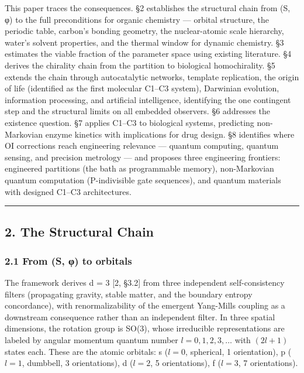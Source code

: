 \documentclass[
]{article}
\begin{document}
This paper traces the consequences. §2 establishes the structural chain
from (S, φ) to the full preconditions for organic chemistry --- orbital
structure, the periodic table, carbon's bonding geometry, the
nuclear-atomic scale hierarchy, water's solvent properties, and the
thermal window for dynamic chemistry. §3 estimates the viable fraction
of the parameter space using existing literature. §4 derives the
chirality chain from the partition to biological homochirality. §5
extends the chain through autocatalytic networks, template replication,
the origin of life (identified as the first molecular C1--C3 system),
Darwinian evolution, information processing, and artificial
intelligence, identifying the one contingent step and the structural
limits on all embedded observers. §6 addresses the existence question.
§7 applies C1--C3 to biological systems, predicting non-Markovian enzyme
kinetics with implications for drug design. §8 identifies where OI
corrections reach engineering relevance --- quantum computing, quantum
sensing, and precision metrology --- and proposes three engineering
frontiers: engineered partitions (the bath as programmable memory),
non-Markovian quantum computation (P-indivisible gate sequences), and
quantum materials with designed C1--C3 architectures.

\begin{center}\rule{0.5\linewidth}{0.5pt}\end{center}

\hypertarget{the-structural-chain}{%
\subsection{2. The Structural Chain}\label{the-structural-chain}}

\hypertarget{from-s-ux3c6-to-orbitals}{%
\subsubsection{2.1 From (S, φ) to
orbitals}\label{from-s-ux3c6-to-orbitals}}

The framework derives d = 3 {[}2, §3.2{]} from three independent
self-consistency filters (propagating gravity, stable matter, and the
boundary entropy concordance), with renormalizability of the emergent
Yang-Mills coupling as a downstream consequence rather than an
independent filter. In three spatial dimensions, the rotation group is
SO(3), whose irreducible representations are labeled by angular momentum
quantum number \(l = 0, 1, 2, 3, \ldots\) with \((2l+1)\) states each.
These are the atomic orbitals: s (\(l = 0\), spherical, 1 orientation),
p (\(l = 1\), dumbbell, 3 orientations), d (\(l = 2\), 5 orientations),
f (\(l = 3\), 7 orientations).
\end{document}
